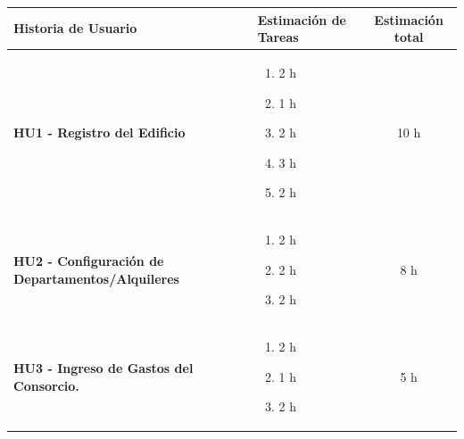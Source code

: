 \begin{longtable}{|p{10.5cm}|p{2.5cm}|c|}
    \hline
            \textbf{Historia de Usuario} 
        & 
            \textbf{Estimación de Tareas} 
        & 
            \textbf{Estimación total} 
    \\ \hline
    \endhead

            \textbf{HU1 - Registro del Edificio} 
        
        & 

            \begin{enumerate}[leftmargin=*,nosep]
                \item 2 h
                \item 1 h
                \item 2 h
                \item 3 h
                \item 2 h
            \end{enumerate} 
        
        &
        
            10 h 
        
    \\ \hline
        
            \textbf{HU2 - Configuración de Departamentos/Alquileres} 
        
        &

            \begin{enumerate}[leftmargin=*,nosep]
                \item 2 h
                \item 2 h
                \item 2 h
            \end{enumerate} 
        
        &
            8 h
    
    \\ \hline
        
            \textbf{HU3 - Ingreso de Gastos del Consorcio.} 
        
        &

            \begin{enumerate}[leftmargin=*,nosep]
                \item 2 h
                \item 1 h
                \item 2 h
            \end{enumerate} 
        
        &
            5 h
    

\end{longtable}

